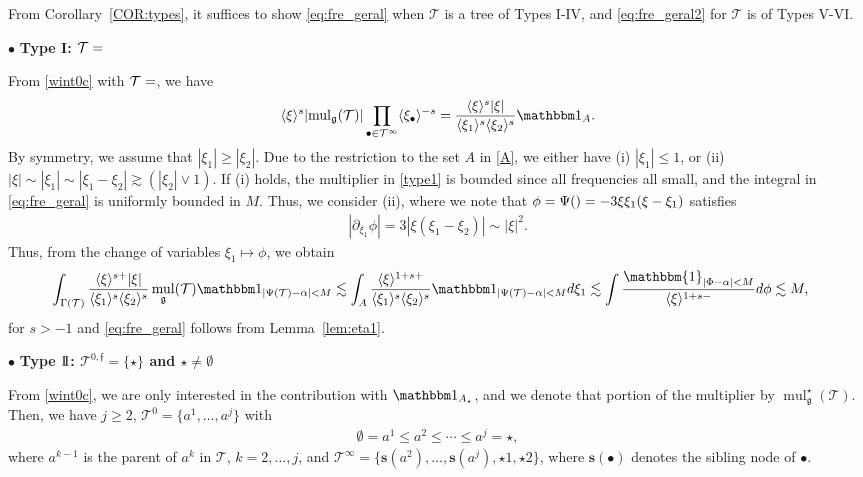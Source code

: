 \documentclass[%
11pt,  reqno]{amsart}
\makeatletter
\newcommand{\fia}{\mathbbm{1}_{|\Phi-\alpha|<M}}
\newcommand{\jap}[1]{\langle #1 \rangle}
\newcommand{\II}{\textup{I \hspace{-2.9mm} I} }
\newcommand{\5}{\textup{V}}
\newcommand{\noi}{\noindent}
\newcommand{\ind}{\mathbbm 1}
\newcommand{\les}{\lesssim}
\theoremstyle{remark}
\newcommand{\bul}{\bullet}
\newcommand{\TT}{\mathcal{T}}
\newcommand{\al}{\alpha}
\newcommand{\G}{\Gamma}
\newcommand{\gfrak}{\mathfrak{g}}
\newcommand{\sbf}{\mathbf{s}}
\newcommand{\ges}{\gtrsim}
\newcommand{\jb}[1]
{\langle #1 \rangle}
\newcommand{\ff}{\mathfrak{f}}
\DeclareMathOperator{\mul}{mul}
\def\<#1>{\csname MH@symb@#1\endcsname}
\numberwithin{equation}{section}
\numberwithin{theorem}{section}
\makeatother
\begin{document}
From Corollary~\ref{COR:types}, it suffices to show \eqref{eq:fre_geral} when $\TT$ is a tree of Types I-IV, and \eqref{eq:fre_geral2} for $\TT$ is of Types V-VI.




\smallskip 
\noi
$\bul$ \textbf{Type I: $\TT=\<1>$ }


From \eqref{wint0c} with $\TT= \<1>$, we have
\begin{align}\label{type1}
\jap{\xi}^s
| {\mul}_\gfrak(\TT) | 
\prod_{\bul\in \TT^\infty} \jap{\xi_\bul}^{-s}
= 
\frac{\jap{\xi}^s |\xi|}{\jap{\xi_1}^s \jap{\xi_2}^s} \ind_{A}.
\end{align}
By symmetry, we assume that $|\xi_1| \ge |\xi_2|$.
Due to the restriction to the set $A$ in \eqref{A}, we either have (i) $|\xi_1| \le 1$, or (ii) $|\xi| \sim |\xi_1| \sim | \xi_1 - \xi_2 | \ges (|\xi_2| \lor 1)$. 
If (i) holds, the multiplier in \eqref{type1} is bounded since all frequencies all small, and the integral in \eqref{eq:fre_geral} is uniformly bounded in $M$. 
Thus, we consider (ii), where we note that $\phi = \Psi(\<1>) = -3 \xi \xi_1(\xi-\xi_1)$ satisfies
\begin{align}
| \partial_{\xi_1} \phi | = 3 | \xi (\xi_1 - \xi_2)| \sim |\xi|^2.
\end{align}
 Thus, from the change of variables $\xi_1 \mapsto \phi $, we obtain
	\begin{align*}
\int_{\G(\TT)} \frac{ \jb{\xi}^{s+ } |\xi| }{\jb{\xi_1}^s \jb{\xi_2}^s } \mul_{\gfrak} (\TT) \ind_{|\Psi(\TT) - \al| < M }
 &
\les 
\int_{A} \frac{\jap{\xi}^{1 + s + }}{\jap{\xi_{1}}^{s}\jap{\xi_{2}}^{s}} \ind_{|\Psi(\TT) - \al| < M } d\xi_{1} 
\les 
 \int \frac{\fia }{ \jap{\xi}^{1 + s- }} d\phi \lesssim M, 
	\end{align*}
	for $s>-1$ and \eqref{eq:fre_geral} follows from Lemma~\ref{lem:eta1}.




\medskip 
\noi
$\bul$ \textbf{Type $\II$: $\TT^{0,\ff} = \{\star\}$ and $\star\ne \emptyset$}

From \eqref{wint0c}, we are only interested in the contribution with $\ind_{A_\star}$, and we denote that portion of the multiplier by $\mul_{\gfrak}^{\star}(\TT)$. 
Then, we have $j\ge2$, $\TT^0 = \{ a^{1}, \ldots, a^{j} \}$ with
\begin{align}
\label{II0}
\emptyset = a^{1} \le a^{2} \le \cdots \le a^{j} = \star, 
\end{align}
where $a^{k-1}$ is the parent of $a^{k}$ in $\TT$, $k=2, \ldots, j$, and $\TT^\infty = \{ \sbf(a^{2}), \ldots, \sbf(a^{j}), \star1, \star2  \}$, where $\sbf(\bul)$ denotes the sibling node of $\bul$. 
\end{document}
